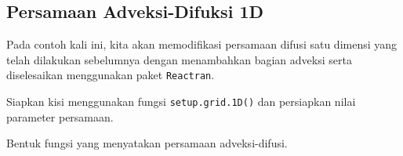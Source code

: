 \documentclass[]{book}
\newenvironment{Shaded}{\begin{snugshade}}{\end{snugshade}}
\newcommand{\CommentTok}[1]{\textcolor[rgb]{0.56,0.35,0.01}{\textit{#1}}}
\newcommand{\ControlFlowTok}[1]{\textcolor[rgb]{0.13,0.29,0.53}{\textbf{#1}}}
\newcommand{\DataTypeTok}[1]{\textcolor[rgb]{0.13,0.29,0.53}{#1}}
\newcommand{\DecValTok}[1]{\textcolor[rgb]{0.00,0.00,0.81}{#1}}
\newcommand{\FloatTok}[1]{\textcolor[rgb]{0.00,0.00,0.81}{#1}}
\newcommand{\KeywordTok}[1]{\textcolor[rgb]{0.13,0.29,0.53}{\textbf{#1}}}
\newcommand{\NormalTok}[1]{#1}
\newcommand{\OperatorTok}[1]{\textcolor[rgb]{0.81,0.36,0.00}{\textbf{#1}}}
\newcommand{\StringTok}[1]{\textcolor[rgb]{0.31,0.60,0.02}{#1}}
\theoremstyle{definition}
\theoremstyle{definition}
\theoremstyle{definition}
\theoremstyle{remark}
\begin{document}
\hypertarget{persamaan-adveksi-difuksi-1d}{%
\subsection{Persamaan Adveksi-Difuksi 1D}\label{persamaan-adveksi-difuksi-1d}}

Pada contoh kali ini, kita akan memodifikasi persamaan difusi satu dimensi yang telah dilakukan sebelumnya dengan menambahkan bagian adveksi serta diselesaikan menggunakan paket \texttt{Reactran}.

Siapkan kisi menggunakan fungsi \texttt{setup.grid.1D()} dan persiapkan nilai parameter persamaan.

\begin{Shaded}
\end{Shaded}

Bentuk fungsi yang menyatakan persamaan adveksi-difusi.

\begin{Shaded}
\end{Shaded}
\end{document}
